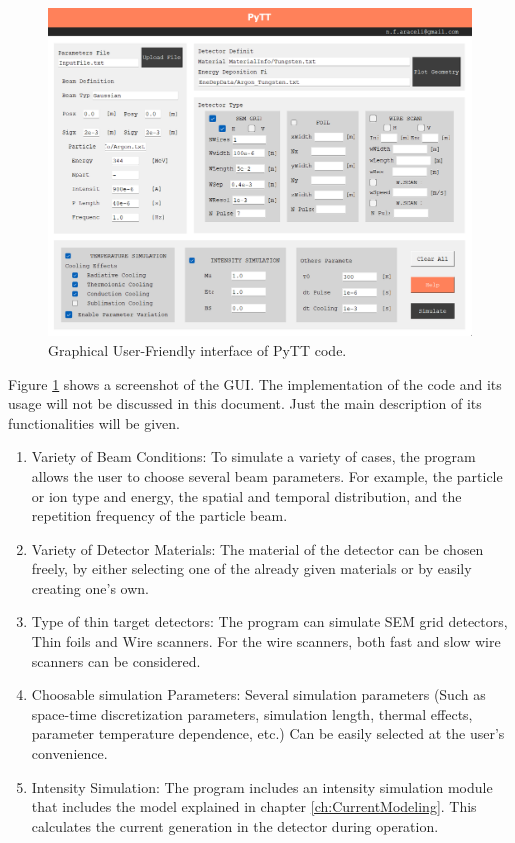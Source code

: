 \begin{figure}[h]
    \centering
    \includegraphics[width=0.9\columnwidth]{PyTT_GUI/PyTTScreanshot.png}
    \caption{Graphical User-Friendly interface of PyTT code.}
    \label{fig:UserFriendly}
\end{figure}

Figure \ref{fig:UserFriendly} shows a screenshot of the GUI. The implementation of the code and its usage will not be discussed in this document. Just the main description of its functionalities will be given. 

\begin{enumerate}
    \item Variety of Beam Conditions: To simulate a variety of cases, the program allows the user to choose several beam parameters. For example, the particle or ion type and energy, the spatial and temporal distribution, and the repetition frequency of the particle beam. 
    \item Variety of Detector Materials: The material of the detector can be chosen freely, by either selecting one of the already given materials or by easily creating one's own. 
    \item Type of thin target detectors: The program can simulate SEM grid detectors, Thin foils and Wire scanners. For the wire scanners, both fast and slow wire scanners can be considered. 
    \item Choosable simulation Parameters:  Several simulation parameters (Such as space-time discretization parameters, simulation length, thermal effects, parameter temperature dependence, etc.) Can be easily selected at the user's convenience. 
    \item Intensity Simulation: The program includes an intensity simulation module that includes the model explained in chapter \ref{ch:CurrentModeling}. This calculates the current generation in the detector during operation. 
\end{enumerate}

